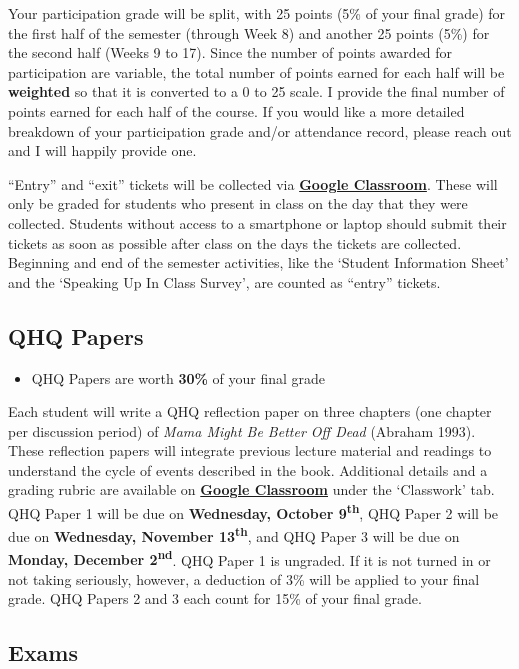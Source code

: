 \documentclass[]{book}
\newenvironment{rmdblock}[1]
  {\begin{shaded*}
  \begin{itemize}
  \renewcommand{\labelitemi}{
    \raisebox{-.7\height}[0pt][0pt]{
      {\setkeys{Gin}{width=3em,keepaspectratio}\texttt{[image: images/\#1]}}
    }
  }
  \item
  }
  {
  \end{itemize}
  \end{shaded*}
  }
\newenvironment{rmdtip}
  {\begin{rmdblock}{tip}}
  {\end{rmdblock}}
\begin{document}
Your participation grade will be split, with 25 points (5\% of your final grade) for the first half of the semester (through Week 8) and another 25 points (5\%) for the second half (Weeks 9 to 17). Since the number of points awarded for participation are variable, the total number of points earned for each half will be \textbf{weighted} so that it is converted to a 0 to 25 scale. I provide the final number of points earned for each half of the course. If you would like a more detailed breakdown of your participation grade and/or attendance record, please reach out and I will happily provide one.

``Entry'' and ``exit'' tickets will be collected via \textbf{\href{https://classroom.google.com}{Google Classroom}}. These will only be graded for students who present in class on the day that they were collected. Students without access to a smartphone or laptop should submit their tickets as soon as possible after class on the days the tickets are collected. Beginning and end of the semester activities, like the `Student Information Sheet' and the `Speaking Up In Class Survey', are counted as ``entry'' tickets.

\hypertarget{qhq-papers}{%
\subsection{QHQ Papers}\label{qhq-papers}}

\begin{rmdtip}
QHQ Papers are worth \textbf{30\%} of your final grade
\end{rmdtip}

Each student will write a QHQ reflection paper on three chapters (one chapter per discussion period) of \emph{Mama Might Be Better Off Dead} (Abraham 1993). These reflection papers will integrate previous lecture material and readings to understand the cycle of events described in the book. Additional details and a grading rubric are available on \textbf{\href{https://classroom.google.com}{Google Classroom}} under the `Classwork' tab. QHQ Paper 1 will be due on \textbf{Wednesday, October 9\textsuperscript{th}}, QHQ Paper 2 will be due on \textbf{Wednesday, November 13\textsuperscript{th}}, and QHQ Paper 3 will be due on \textbf{Monday, December 2\textsuperscript{nd}}. QHQ Paper 1 is ungraded. If it is not turned in or not taking seriously, however, a deduction of 3\% will be applied to your final grade. QHQ Papers 2 and 3 each count for 15\% of your final grade.

\hypertarget{exams}{%
\subsection{Exams}\label{exams}}
\end{document}
